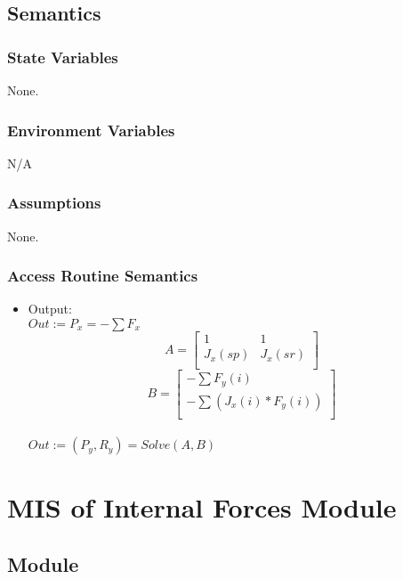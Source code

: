 \documentclass[12pt, titlepage]{article}
\begin{document}
\subsection{Semantics}
\subsubsection{State Variables}
None.

\subsubsection{Environment Variables}
N/A

\subsubsection{Assumptions}
None.
\subsubsection{Access Routine Semantics}
\begin{itemize}
    \item Output: \\
    $Out:=P_x=-\sum F_x$\\
\[A=
   \left[ {\begin{array}{cc}
    1 & 1 \\
    J_x(sp) & J_x(sr) \\
  \end{array} } \right]\]
\[B=
   \left[ {\begin{array}{cc}
    -\sum F_y(i) \\
    -\sum (J_x(i)* F_y(i))  \\
  \end{array} } \right]
\]\\ 
$Out:=(P_y,R_y) = Solve(A,B)$\\

\end{itemize}

\section{MIS of Internal Forces Module\label{mSpec} }

\subsection{Module}
\end{document}
